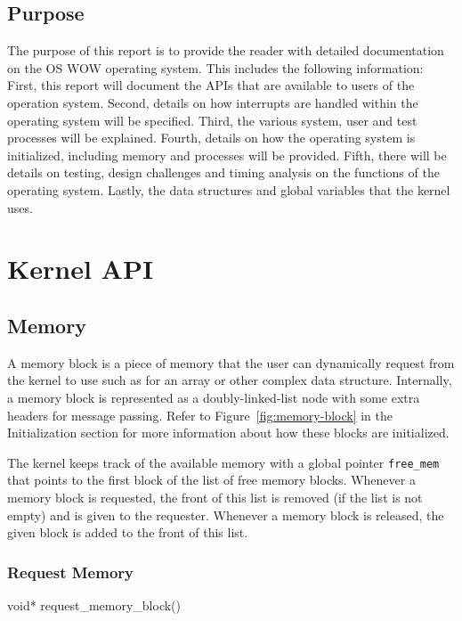 \documentclass[se]{uw-wkrpt}
\begin{document}
\subsection{Purpose}

The purpose of this report is to provide the reader with detailed documentation on the OS WOW operating system. This includes the following information:  First, this report will document the APIs that are available to users of the operation system. Second, details on how interrupts are handled within the operating system will be specified. Third, the various system, user and test processes will be explained. Fourth, details on how the operating system is initialized, including memory and processes will be provided. Fifth, there will be details on testing, design challenges and timing analysis on the functions of the operating system. Lastly, the data structures and global variables that the kernel uses.

\section{Kernel API} \label{sec:kernel}

\subsection{Memory}

A memory block is a piece of memory that the user can dynamically request from the kernel to use such as for an array or other complex data structure. Internally, a memory block is represented as a doubly-linked-list node with some extra headers for message passing. Refer to Figure~\ref{fig:memory-block} in the Initialization section for more information about how these blocks are initialized.

The kernel keeps track of the available memory with a global pointer \texttt{free\_mem} that points to the first block of the list of free memory blocks. Whenever a memory block is requested, the front of this list is removed (if the list is not empty) and is given to the requester. Whenever a memory block is released, the given block is added to the front of this list.

\subsubsection{Request Memory}
\begin{code}
void* request_memory_block()
\end{code}
\end{document}
